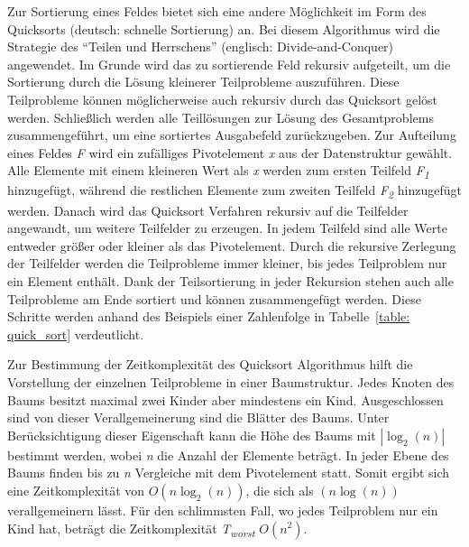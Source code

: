 Zur Sortierung eines Feldes bietet sich eine andere Möglichkeit im Form des Quicksorts (deutsch: schnelle Sortierung) an. Bei diesem Algorithmus wird die Strategie des \enquote{Teilen und Herrschens} (englisch: Divide-and-Conquer) angewendet. Im Grunde wird das zu sortierende Feld rekursiv aufgeteilt, um die Sortierung durch die Lösung kleinerer Teilprobleme auszuführen. Diese Teilprobleme können möglicherweise auch rekursiv durch das Quicksort gelöst werden. Schließlich werden alle Teillösungen zur Lösung des Gesamtproblems zusammengeführt, um eine sortiertes Ausgabefeld zurückzugeben. Zur Aufteilung eines Feldes \textit{F} wird ein zufälliges Pivotelement \textit{x} aus der Datenstruktur gewählt. Alle Elemente mit einem kleineren Wert als \textit{x} werden zum ersten Teilfeld \textit{F\textsubscript{1}} hinzugefügt, während die restlichen Elemente zum zweiten Teilfeld \textit{F\textsubscript{2}} hinzugefügt werden. Danach wird das Quicksort Verfahren rekursiv auf die Teilfelder angewandt, um weitere Teilfelder zu erzeugen. In jedem Teilfeld sind alle Werte entweder größer oder kleiner als das Pivotelement. Durch die rekursive Zerlegung der Teilfelder werden die Teilprobleme immer kleiner, bis jedes Teilproblem nur ein Element enthält. Dank der Teilsortierung in jeder Rekursion stehen auch alle Teilprobleme am Ende sortiert und können zusammengefügt werden. Diese Schritte werden anhand des Beispiels einer Zahlenfolge in Tabelle~\ref{table: quick_sort} verdeutlicht. \autocite[76-77]{knebl_algorithmen_2021}

Zur Bestimmung der Zeitkomplexität des Quicksort Algorithmus hilft die Vorstellung der einzelnen Teilprobleme in einer Baumstruktur. Jedes Knoten des Baums besitzt maximal zwei Kinder aber mindestens ein Kind. Ausgeschlossen sind von dieser Verallgemeinerung sind die Blätter des Baums. Unter Berücksichtigung dieser Eigenschaft kann die Höhe des Baums mit $|\log_{2}(n)|$ bestimmt werden, wobei \textit{n} die Anzahl der Elemente beträgt. In jeder Ebene des Baums finden bis zu \textit{n} Vergleiche mit dem Pivotelement statt. Somit ergibt sich eine Zeitkomplexität von $O(n\log_{2}(n))$, die sich als $(n\log(n))$ verallgemeinern lässt. Für den schlimmsten Fall, wo jedes Teilproblem nur ein Kind hat, beträgt die Zeitkomplexität \textit{T\textsubscript{worst}} $O(n^2)$. \autocite[216-217]{hubwieser_fundamente_2015} \autocite[79]{knebl_algorithmen_2021} \autocite[169-170]{sanders_sequential_2019}


